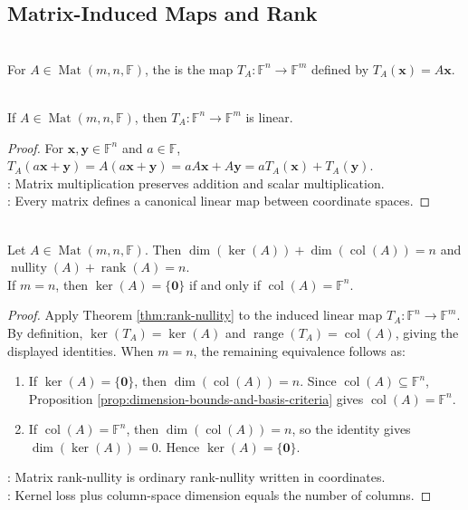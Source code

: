 \subsection{Matrix-Induced Maps and Rank}
\begin{definition} \\
For $A\in\operatorname{Mat}(m,n,\mathbb{F})$, the  is the map $T_A:\mathbb{F}^n\to\mathbb{F}^m$ defined by $T_A(\mathbf{x})=A\mathbf{x}$.
\end{definition}

\begin{proposition} \label{prop:matrix-induced-map-linear} \\
If $A\in\operatorname{Mat}(m,n,\mathbb{F})$, then $T_A:\mathbb{F}^n\to\mathbb{F}^m$ is linear.
\begin{proof}
For $\mathbf{x},\mathbf{y}\in\mathbb{F}^n$ and $a\in\mathbb{F}$, $T_A(a\mathbf{x}+\mathbf{y})=A(a\mathbf{x}+\mathbf{y})=aA\mathbf{x}+A\mathbf{y}=aT_A(\mathbf{x})+T_A(\mathbf{y})$.\\
: Matrix multiplication preserves addition and scalar multiplication.\\
: Every matrix defines a canonical linear map between coordinate spaces.
\end{proof}
\end{proposition}

\begin{corollary} \label{cor:matrix-rank-nullity} \\
Let $A\in\operatorname{Mat}(m,n,\mathbb{F})$. Then $\dim(\ker(A))+\dim(\operatorname{col}(A))=n$ and $\operatorname{nullity}(A)+\operatorname{rank}(A)=n$.\\
If $m=n$, then $\ker(A)=\{\mathbf{0}\}$ if and only if $\operatorname{col}(A)=\mathbb{F}^n$.
\begin{proof}
Apply Theorem \ref{thm:rank-nullity} to the induced linear map $T_A:\mathbb{F}^n\to\mathbb{F}^m$. By definition, $\ker(T_A)=\ker(A)$ and $\operatorname{range}(T_A)=\operatorname{col}(A)$, giving the displayed identities. When $m=n$, the remaining equivalence follows as:
\begin{enumerate}[label=\roman*.]
\setlength{\itemsep}{0pt}
\item[$(\Rightarrow)$] If $\ker(A)=\{\mathbf{0}\}$, then $\dim(\operatorname{col}(A))=n$. Since $\operatorname{col}(A)\subseteq\mathbb{F}^n$, Proposition \ref{prop:dimension-bounds-and-basis-criteria} gives $\operatorname{col}(A)=\mathbb{F}^n$.
\item[$(\Leftarrow)$] If $\operatorname{col}(A)=\mathbb{F}^n$, then $\dim(\operatorname{col}(A))=n$, so the identity gives $\dim(\ker(A))=0$. Hence $\ker(A)=\{\mathbf{0}\}$.
\end{enumerate}
: Matrix rank-nullity is ordinary rank-nullity written in coordinates.\\
: Kernel loss plus column-space dimension equals the number of columns.
\end{proof}
\end{corollary}

